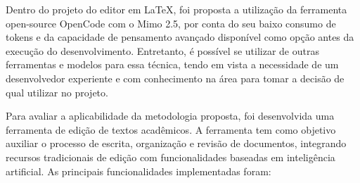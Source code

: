 Dentro do projeto do editor em \LaTeX{}, foi proposta a utilização da ferramenta open-source OpenCode com o Mimo 2.5, por conta do seu baixo consumo de tokens e da capacidade de pensamento avançado disponível como opção antes da execução do desenvolvimento. Entretanto, é possível se utilizar de outras ferramentas e modelos para essa técnica, tendo em vista a necessidade de um desenvolvedor experiente e com conhecimento na área para tomar a decisão de qual utilizar no projeto.

Para avaliar a aplicabilidade da metodologia proposta, foi desenvolvida uma ferramenta de edição de textos acadêmicos. A ferramenta tem como objetivo auxiliar o processo de escrita, organização e revisão de documentos, integrando recursos tradicionais de edição com funcionalidades baseadas em inteligência artificial. As principais funcionalidades implementadas foram:

